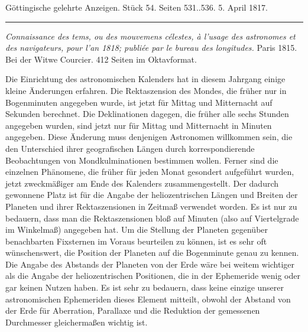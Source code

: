 \clearpage
{}
\hypertarget{native-600-lower}{}

\begin{center}\small Göttingische gelehrte Anzeigen. Stück 54. Seiten 531..536. 5. April 1817.\\[3pt]\rule{.72\linewidth}{.3pt}\end{center}

\emph{Connaissance des tems, ou des mouvemens célestes, à l'usage des astronomes et des navigateurs, pour l'an \textup{1818}; publiée par le bureau des longitudes.} Paris 1815. Bei der Witwe Courcier. 412 Seiten im Oktavformat.

\begingroup{}\relax
Die Einrichtung des astronomischen Kalenders hat in diesem Jahrgang einige kleine Änderungen erfahren. Die Rektaszension des Mondes, die früher nur in Bogenminuten angegeben wurde, ist jetzt für Mittag und Mitternacht auf Sekunden berechnet. Die Deklinationen dagegen, die früher alle sechs Stunden angegeben wurden, sind jetzt nur für Mittag und Mitternacht in Minuten angegeben. Diese Änderung muss denjenigen Astronomen willkommen sein, die den Unterschied ihrer geografischen Längen durch korrespondierende Beobachtungen von Mondkulminationen bestimmen wollen. Ferner sind die einzelnen Phänomene, die früher für jeden Monat gesondert aufgeführt wurden, jetzt zweckmäßiger am Ende des Kalenders zusammengestellt. Der dadurch gewonnene Platz ist für die Angabe der heliozentrischen Längen und Breiten der Planeten und ihrer Rektaszensionen in Zeitmaß verwendet worden. Es ist nur zu bedauern, dass man die Rektaszensionen bloß auf Minuten (also auf Viertelgrade im Winkelmaß) angegeben hat. Um die Stellung der Planeten gegenüber benachbarten Fixsternen im Voraus beurteilen zu können, ist es sehr oft wünschenswert, die Position der Planeten auf die Bogenminute genau zu kennen. Die Angabe des Abstands der Planeten von der Erde wäre bei weitem wichtiger als die Angabe der heliozentrischen Positionen, die in der Ephemeride wenig oder gar keinen Nutzen haben. Es ist sehr zu bedauern, dass keine einzige unserer astronomischen Ephemeriden dieses Element mitteilt, obwohl der Abstand von der Erde für Aberration, Parallaxe und die Reduktion der gemessenen Durchmesser gleichermaßen wichtig ist.

